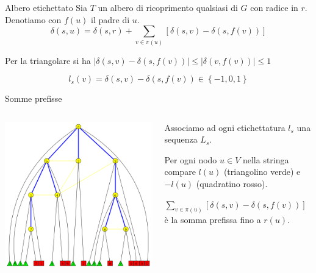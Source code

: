 \documentclass{beamer}
\theoremstyle{plain}
\theoremstyle{definition}
\theoremstyle{remark}
\newcommand{\set}[1]{\left\{#1\right\}}
\newcommand{\pa}[1]{\left(#1\right)}
\newcommand{\bra}[1]{\left[#1\right]}
\newcommand{\abs}[1]{\left|#1\right|}
\begin{document}
\begin{frame}{Albero etichettato}
  Sia $T$ un albero di ricoprimento qualsiasi di $G$ con radice in
  $r$. Denotiamo con $f(u)$ il padre di $u$.
  \vfill
  \[ \delta\pa{ s,u} = \delta\pa{ s,r} + \sum _{v\in \pi (u)} \bra{
    \delta\pa{ s,v} - \delta\pa{ s,f(v) } } \]
  
  Per la triangolare si ha $\abs{\delta\pa{ s,v} - \delta\pa{ s,f(v)}
  } \le \abs{\delta\pa{v,f(v)}} \le 1$ \vfill
  
  \pause
  \[ l_s(v) = \delta\pa{s,v} - \delta\pa{ s, f(v) } \in \set{
    -1,0,1} \]
\end{frame}

\begin{frame}{Somme prefisse}
  \begin{columns}
    \begin{column}{0.6\textwidth}
      \includegraphics[width=\textwidth]{labeltree}
    \end{column}
    \begin{column}{0.4\textwidth}
      Associamo ad ogni etichettatura $l_s$ una sequenza $L_s$.

      Per ogni nodo $u\in V$ nella stringa compare $l(u)$ (triangolino
      verde) e $-l(u)$ (quadratino rosso).  \vfill \pause
      
      $\sum _{v\in \pi(u)} \bra{ \delta\pa{ s,v} - \delta\pa{ s,f(v) } }$
      \`e la somma prefissa fino a $r(u)$.
    \end{column}
  \end{columns}
\end{frame}
\end{document}
